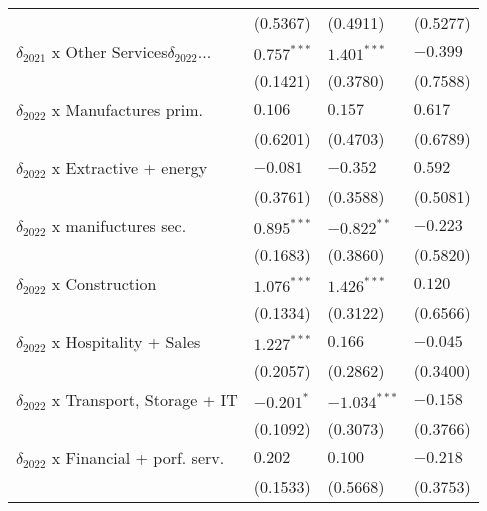 \begin{table}[h!]
{{\begin{tabular}{llll}
                                                   &           (0.5367) &           (0.4911) &           (0.5277) \\
$\delta_{2021}$ x Other Services$\delta_{2022}$... &      $0.757^{***}$ &      $1.401^{***}$ &           $-0.399$ \\
                                                   &           (0.1421) &           (0.3780) &           (0.7588) \\
$\delta_{2022}$ x Manufactures prim.               &            $0.106$ &            $0.157$ &            $0.617$ \\
                                                   &           (0.6201) &           (0.4703) &           (0.6789) \\
$\delta_{2022}$ x Extractive + energy              &           $-0.081$ &           $-0.352$ &            $0.592$ \\
                                                   &           (0.3761) &           (0.3588) &           (0.5081) \\
$\delta_{2022}$ x manifuctures sec.                &      $0.895^{***}$ &      $-0.822^{**}$ &           $-0.223$ \\
                                                   &           (0.1683) &           (0.3860) &           (0.5820) \\
$\delta_{2022}$ x Construction                     &      $1.076^{***}$ &      $1.426^{***}$ &            $0.120$ \\
                                                   &           (0.1334) &           (0.3122) &           (0.6566) \\
$\delta_{2022}$ x Hospitality + Sales              &      $1.227^{***}$ &            $0.166$ &           $-0.045$ \\
                                                   &           (0.2057) &           (0.2862) &           (0.3400) \\
$\delta_{2022}$ x Transport, Storage + IT          &         $-0.201^*$ &     $-1.034^{***}$ &           $-0.158$ \\
                                                   &           (0.1092) &           (0.3073) &           (0.3766) \\
$\delta_{2022}$ x Financial + porf. serv.          &            $0.202$ &            $0.100$ &           $-0.218$ \\
                                                   &           (0.1533) &           (0.5668) &           (0.3753) \\

\end{tabular}}}
\end{table}
